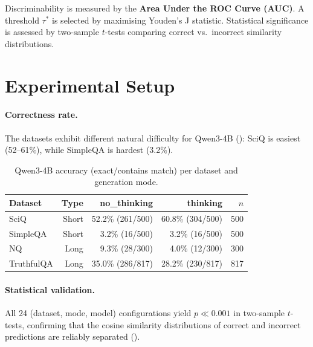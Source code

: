 \documentclass[11pt,a4paper]{article}
\begin{document}
Discriminability is measured by the \textbf{Area Under the ROC Curve (AUC)}.
A threshold $\tau^*$ is selected by maximising Youden's J statistic.
Statistical significance is assessed by two-sample $t$-tests comparing correct vs.\
incorrect similarity distributions.

\section{Experimental Setup}
\label{sec:setup}

\paragraph{Correctness rate.}
The datasets exhibit different natural difficulty for Qwen3-4B
(): SciQ is easiest (52–61\%), while SimpleQA is hardest (3.2\%).

\begin{table}[ht]
\centering
\caption{Qwen3-4B accuracy (exact/contains match) per dataset and generation mode.}
\label{tab:accuracy}
\begin{tabular}{lrrrr}
\toprule
\textbf{Dataset} & \textbf{Type} & \textbf{no\_thinking} & \textbf{thinking} & $n$ \\
\midrule
SciQ       & Short & 52.2\% (261/500)  & 60.8\% (304/500) & 500 \\
SimpleQA   & Short &  3.2\% (16/500)   &  3.2\% (16/500)  & 500 \\
NQ         & Long  &  9.3\% (28/300)   &  4.0\% (12/300)  & 300 \\
TruthfulQA & Long  & 35.0\% (286/817)  & 28.2\% (230/817) & 817 \\
\bottomrule
\end{tabular}
\end{table}

\paragraph{Statistical validation.}
All 24 (dataset, mode, model) configurations yield $p \ll 0.001$ in
two-sample $t$-tests, confirming that the cosine similarity distributions of
correct and incorrect predictions are reliably separated (\Cref{tab:stats}).
\end{document}
